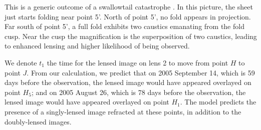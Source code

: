 \documentclass[useAMS,usenatbib]{mn2e}
\begin{document}
This is a generic outcome of a swallowtail
catastrophe \citep{Arnold1990}.  In this picture, the sheet just
starts folding near point 5'.  North of point 5', no fold appears in
projection.  Far south of point 5', a full fold exhibits two caustics
emanating from the fold cusp.  Near the cusp the magnification is the
superposition of two caustics, leading to enhanced lensing and higher
likelihood of being observed.  

We denote $t_1$ the time for the lensed image on lens 2 to move from point
$H$ to point $J$.  From our calculation, we predict that on 2005 September 14, which is 59 days before the observation, the lensed image would have appeared overlayed on point $H_5$; and on 2005 August 26, which is 78 days before the observation, the lensed image would have appeared overlayed on point $H_1$.
The
model predicts the presence of a singly-lensed image refracted at
these points, in addition to the doubly-lensed images.

\end{document}
